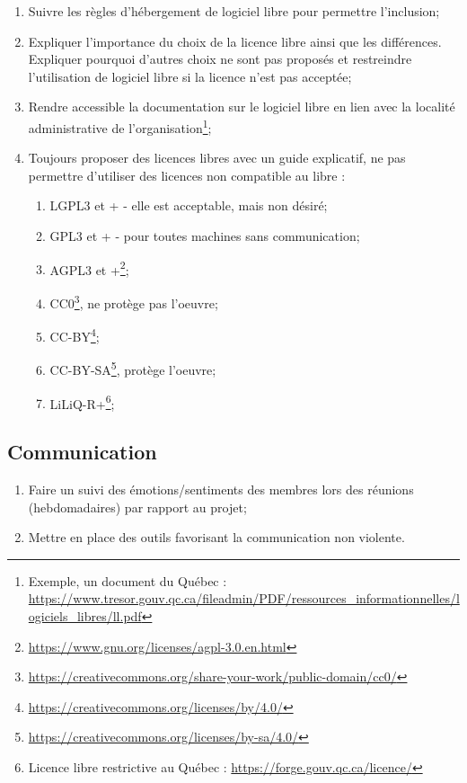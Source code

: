 \begin{enumerate}
    \item Suivre les règles d'hébergement de logiciel libre pour permettre l'inclusion;
    \item Expliquer l'importance du choix de la licence libre ainsi que les différences. Expliquer pourquoi d'autres choix ne sont pas proposés et restreindre l'utilisation de logiciel libre si la licence n'est pas acceptée;
    \item Rendre accessible la documentation sur le logiciel libre en lien avec la localité administrative de l'organisation\footnote{Exemple, un document du Québec : \url{https://www.tresor.gouv.qc.ca/fileadmin/PDF/ressources_informationnelles/logiciels_libres/ll.pdf}};
    \item Toujours proposer des licences libres avec un guide explicatif, ne pas permettre d'utiliser des licences non compatible au libre :
    \begin{enumerate}
        \item LGPL3 et + - elle est acceptable, mais non désiré;
        \item GPL3 et + - pour toutes machines sans communication;
        \item AGPL3 et +\footnote{\url{https://www.gnu.org/licenses/agpl-3.0.en.html}};
        \item CC0\footnote{\url{https://creativecommons.org/share-your-work/public-domain/cc0/}}, ne protège pas l'oeuvre;
        \item CC-BY\footnote{\url{https://creativecommons.org/licenses/by/4.0/}};
        \item CC-BY-SA\footnote{\url{https://creativecommons.org/licenses/by-sa/4.0/}}, protège l'oeuvre;
        \item LiLiQ-R+\footnote{Licence libre restrictive au Québec : \url{https://forge.gouv.qc.ca/licence/}};
    \end{enumerate}
\end{enumerate}

\subsection{Communication}

\begin{enumerate}
    \item Faire un suivi des émotions/sentiments des membres lors des réunions (hebdomadaires) par rapport au projet;
    \item Mettre en place des outils favorisant la communication non violente.
\end{enumerate}

